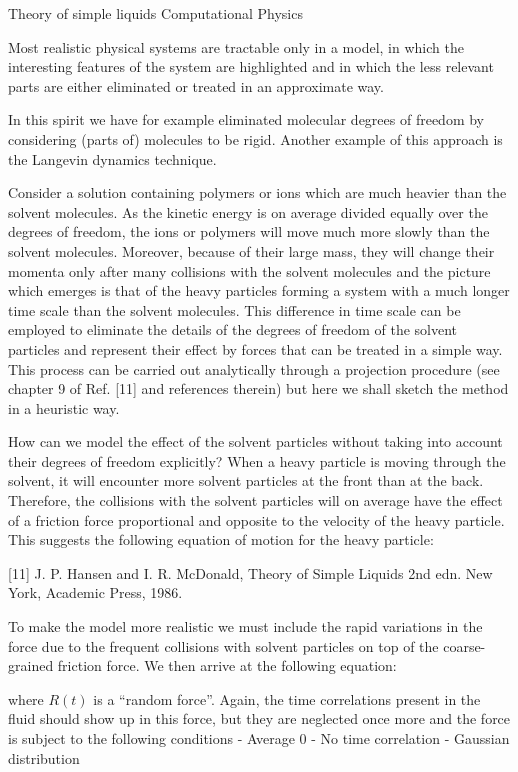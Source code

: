 \documentclass[../../main-notes.tex]{subfiles}
\begin{document}
Theory of simple liquids 
Computational Physics\citep{Thijssen_2007}

Most realistic physical systems are tractable only in a model, in which the interesting features of the system are highlighted and in which the less relevant parts are either eliminated or treated in an approximate way. 

In this spirit we have for example eliminated molecular degrees of freedom by considering (parts of) molecules to be rigid. 
Another example of this approach is the Langevin dynamics technique. 

Consider a solution containing polymers or ions which are much heavier than the solvent molecules. 
As the kinetic energy is on average divided equally over the degrees of freedom, the ions or polymers will move much more slowly than the solvent molecules.
Moreover, because of their large mass, they will change their momenta only after many collisions with the solvent molecules and the picture which emerges is that of the heavy particles forming a system with a much longer time scale than the solvent molecules.
This difference in time scale can be employed to eliminate the details of the degrees of freedom of the solvent particles and represent their effect by forces that can be treated in a simple way.
This process can be carried out analytically through a projection procedure (see chapter 9 of Ref. [11] and references therein) but here we shall sketch the method in a heuristic way.

How can we model the effect of the solvent particles without taking into account their degrees of freedom explicitly? 
When a heavy particle is moving through the solvent, it will encounter more solvent particles at the front than at the back. 
Therefore, the collisions with the solvent particles will on average have the effect of a friction force proportional and opposite to the velocity of the heavy particle. 
This suggests the following equation of motion for the heavy particle:

[11] J. P. Hansen and I. R. McDonald, Theory of Simple Liquids 2nd edn. New York, Academic Press, 1986.

To make the model more realistic we must include the rapid variations in the force due to the frequent collisions with solvent particles on top of the coarse-grained friction force. 
We then arrive at the following equation:

where $R(t)$ is a ``random force''.
Again, the time correlations present in the fluid should show up in this force, but they are neglected once more and the force is subject to the following conditions 
- Average $0$
- No time correlation
- Gaussian distribution
\end{document}
